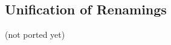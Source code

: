 \documentclass{amsart}
\let\types\vdash %
\def\cb{\mid} %
\def\p{^+} %
\def\m{^-}
\let\mypm\pm
\def\pm{^\mypm}
\def\pms{\mypm}
\def\flip#1{#1^*} %
\def\pcol{\overset{\scriptscriptstyle +}{:}}
\def\mcol{\overset{\scriptscriptstyle -}{:}}
\def\pmcol{\overset{\scriptscriptstyle \pm}{:}}
\newcommand\vcol[1]{\overset{\scriptscriptstyle #1}{:}}
\newcommand\combine{,}
\newcommand\combineU{\sqcup}
\newcommand{\unif}[4]{#1\doteq #2\,\mathsf{ via }\,#3\cb #4}
\begin{document}
\subsection{Unification of Renamings}

(not ported yet)






\end{document}

